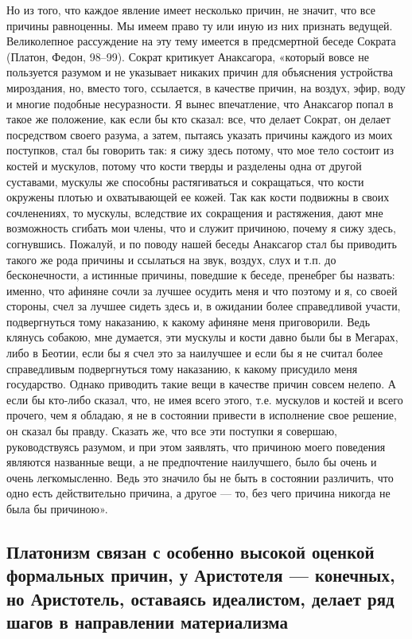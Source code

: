 Но из того, что каждое явление  имеет несколько причин, не значит, что
все причины  равноценны. Мы имеем  право ту  или иную из  них признать
ведущей. Великолепное  рассуждение на эту тему  имеется в предсмертной
беседе Сократа  (Платон, Федон, 98--99). Сократ  критикует Анаксагора,
«который вовсе не пользуется разумом и не указывает никаких причин для
объяснения  устройства  мироздания,  но,  вместо  того,  ссылается,  в
качестве причин, на воздух, эфир, воду и многие подобные несуразности.
Я вынес  впечатление, что  Анаксагор попал в  такое же  положение, как
если  бы кто  сказал: все,  что делает  Сократ, он  делает посредством
своего  разума,  а затем,  пытаясь  указать  причины каждого  из  моих
поступков, стал  бы говорить так:  я сижу  здесь потому, что  мое тело
состоит из костей и мускулов, потому что кости тверды и разделены одна
от другой суставами, мускулы  же способны растягиваться и сокращаться,
что  кости окружены  плотью и  охватывающей  ее кожей.  Так как  кости
подвижны в своих  сочленениях, то мускулы, вследствие  их сокращения и
растяжения,  дают мне  возможность  сгибать мои  члены,  что и  служит
причиною, почему я сижу здесь,  согнувшись. Пожалуй, и по поводу нашей
беседы Анаксагор стал бы приводить  такого же рода причины и ссылаться
на звук,  воздух, слух  и т.п. до  бесконечности, а  истинные причины,
поведшие к беседе, пренебрег бы  назвать: именно, что афиняне сочли за
лучшее  осудить  меня и  что  поэтому  и  я,  со своей  стороны,  счел
за  лучшее  сидеть здесь  и,  в  ожидании более  справедливой  участи,
подвергнуться тому наказанию, к  какому афиняне меня приговорили. Ведь
клянусь собакою,  мне думается, эти  мускулы и  кости давно были  бы в
Мегарах, либо в Беотии, если бы я счел это за наилучшее и если бы я не
считал  более  справедливым  подвергнуться тому  наказанию,  к  какому
присудило  меня государство.  Однако приводить  такие вещи  в качестве
причин совсем  нелепо. А если бы  кто-либо сказал, что, не  имея всего
этого,  т.е. мускулов  и  костей и  всего прочего,  чем  я обладаю,  я
не  в состоянии  привести  в  исполнение свое  решение,  он сказал  бы
правду. Сказать  же, что все  эти поступки я  совершаю, руководствуясь
разумом, и  при этом заявлять,  что причиною моего  поведения являются
названные вещи,  а не предпочтение  наилучшего, было бы очень  и очень
легкомысленно. Ведь это значило бы  не быть в состоянии различить, что
одно есть  действительно причина,  а другое ---  то, без  чего причина
никогда не была бы причиною».

\subsection{Платонизм  связан с  особенно  высокой оценкой  формальных
причин,   у  Аристотеля   ---  конечных,   но  Аристотель,   оставаясь
идеалистом, делает ряд шагов в направлении материализма}

